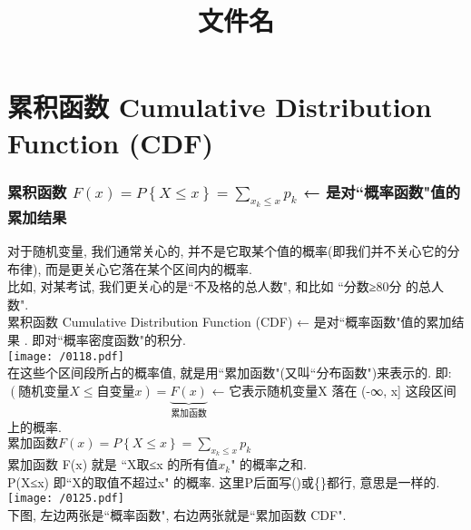 \documentclass[UTF8]{ctexart}
\title{文件名}
\begin{document}
	\tableofcontents %
	\date{} %
	\maketitle  %
	
	
	\part{累积函数 Cumulative Distribution Function (CDF)}
	
	
	\section{累积函数 $ 	F\left( x \right) =P\left\{ X\leq x \right\} =\sum_{x_k\leq x}^{}{p_k}$  ← 是对``概率函数"值的累加结果}
	
	
	对于随机变量, 我们通常关心的, 并不是它取某个值的概率(即我们并不关心它的分布律), 而是更关心它落在某个区间内的概率.  \\
	比如, 对某考试, 我们更关心的是``不及格的总人数", 和比如 ``分数≥80分 的总人数". \\
	
	
	累积函数 Cumulative Distribution Function (CDF) ← 是对``概率函数"值的累加结果 . 即对``概率密度函数"的积分.  \\
	
	\texttt{[image: /0118.pdf]} \\
	
	
	在这些个区间段所占的概率值, 就是用``累加函数"(又叫``分布函数")来表示的. 即: \\
	$ (\text{随机变量}X\leq \text{自变量}x)=\underset{\text{累加函数}}{\underbrace{F(x)}}
	$ ← 它表示随机变量X 落在 (-∞, x] 这段区间上的概率. \\
	
	$\boxed{
		\text{累加函数} F\left( x \right) =P\left\{ X\leq x \right\} =\sum_{x_k\leq x}^{}{p_k}
	}$ \\
	
	累加函数 F(x) 就是 ``X取≤x 的所有值$x_k$" 的概率之和. \\
	P(X≤x) 即``X的取值不超过x" 的概率. 这里P后面写()或\{\}都行, 意思是一样的. \\
	
	
	\texttt{[image: /0125.pdf]} \\
	
	
	
	
	下图, 左边两张是``概率函数", 右边两张就是``累加函数 CDF". \\
	
\end{document}
